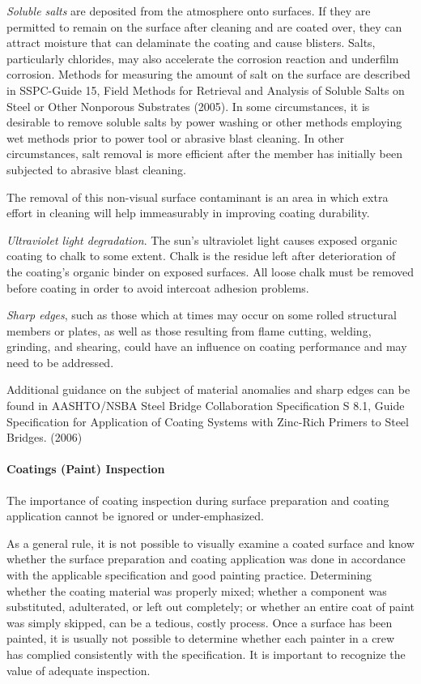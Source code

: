 \emph{Soluble salts} are deposited from the atmosphere onto surfaces. If they are permitted to remain on the surface
after cleaning and are coated over, they can attract moisture that can delaminate the coating and cause blisters. Salts,
particularly chlorides, may also accelerate the corrosion reaction and underfilm corrosion. Methods for measuring
the amount of salt on the surface are described in SSPC-Guide 15, Field Methods for Retrieval and Analysis of
Soluble Salts on Steel or Other Nonporous Substrates (2005). In some circumstances, it is desirable to remove
soluble salts by power washing or other methods employing wet methods prior to power tool or abrasive blast
cleaning. In other circumstances, salt removal is more efficient after the member has initially been subjected to
abrasive blast cleaning.

The removal of this non-visual surface contaminant is an area in which extra effort in cleaning will help
immeasurably in improving coating durability.

\emph{Ultraviolet light degradation}. The sun’s ultraviolet light causes exposed organic coating to chalk to some
extent. Chalk is the residue left after deterioration of the coating’s organic binder on exposed surfaces. All loose
chalk must be removed before coating in order to avoid intercoat adhesion problems.

\emph{Sharp edges}, such as those which at times may occur on some rolled structural members or plates, as well as
those resulting from flame cutting, welding, grinding, and shearing, could have an influence on coating performance
and may need to be addressed.

Additional guidance on the subject of material anomalies and sharp edges can be found in AASHTO/NSBA Steel
Bridge Collaboration Specification S 8.1, Guide Specification for Application of Coating Systems with Zinc-Rich
Primers to Steel Bridges. (2006)

\paragraph{Coatings (Paint) Inspection}

The importance of coating inspection during surface preparation and coating application cannot be ignored or
under-emphasized.

As a general rule, it is not possible to visually examine a coated surface and know whether the surface
preparation and coating application was done in accordance with the applicable specification and good painting
practice. Determining whether the coating material was properly mixed; whether a component was substituted,
adulterated, or left out completely; or whether an entire coat of paint was simply skipped, can be a tedious, costly
process. Once a surface has been painted, it is usually not possible to determine whether each painter in a crew has
complied consistently with the specification. It is important to recognize the value of adequate inspection.

